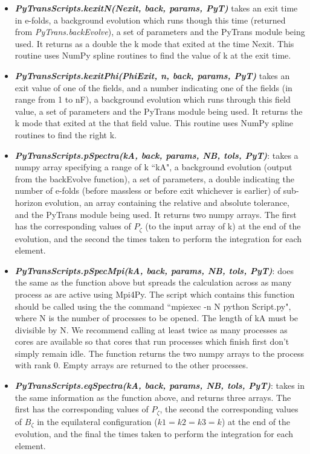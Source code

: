 \documentclass[10pt,
amsmath,amssymb,
aps,prd,nofootinbib,eqsecnum,a4paper]{revtex4}
\begin{document}
\begin{itemize}
\item { \it \bf PyTransScripts.kexitN(Nexit, back, params, PyT)} takes an exit time in e-folds, a background evolution which runs though this time (returned from {\it PyTrans.backEvolve}),  
a set of parameters and the PyTrans module being used. It  returns as a double the k mode that exited at the time Nexit. This routine uses NumPy spline 
routines to find the value of k at the exit time.

\item { \it \bf PyTransScripts.kexitPhi(PhiExit, n, back, params, PyT)} takes an exit value of one of the fields, and a number indicating one of the fields (in range from 1 to nF), a background evolution which runs through this field value,  
a set of parameters and the PyTrans module being used. It returns the k mode that exited at the that field value. This routine uses NumPy spline routines to find the right k.

\item { \it \bf PyTransScripts.pSpectra(kA, back, params, NB, tols, PyT)}: takes a numpy array specifying  a range of k ``kA", a background evolution (output from the backEvolve function), a set of parameters, a double indicating the number of e-folds (before massless or before exit whichever is earlier) of sub-horizon evolution, an array containing the relative and absolute tolerance, and the PyTrans module being used. It returns two numpy arrays. The first has the corresponding values of $P_\zeta$ (to the input array of k) at the end of the evolution, and the second the times taken to perform the integration for each element.

\item { \it \bf PyTransScripts.pSpecMpi(kA, back, params, NB, tols, PyT)}: does the same as the function above but spreads the calculation across as many process as are active using Mpi4Py. The script which contains this function should be called using the the command ``mpiexec -n N python Script.py", where N is the number of processes to be opened. The length of kA must be divisible by N. We recommend calling at least twice as many processes as cores are available so that cores that run processes which finish first don't simply remain idle.  The function returns the two numpy arrays to the process with rank 0. Empty arrays are returned to the other processes. 


\item { \it \bf PyTransScripts.eqSpectra(kA, back, params, NB, tols, PyT)}: takes in the same information as the function above, and returns three arrays. The first has the corresponding values of $P_\zeta$, the second the corresponding values of $B_\zeta$ in the equilateral configuration ($k1=k2=k3=k$) at the end of the evolution, and the final the times taken to perform the integration for each element.



\end{itemize}
\end{document}
